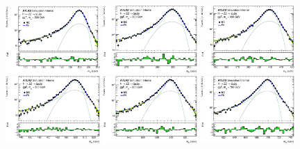 \begin{figure}[htbp]
    \centering
    \includegraphics[width=0.32\textwidth]{figures/HMHZZ/signal/ggf_mass_signal_200_H4l_2mu2e.eps}
    \includegraphics[width=0.32\textwidth]{figures/HMHZZ/signal/ggf_mass_signal_300_H4l_2mu2e.eps}
    \includegraphics[width=0.32\textwidth]{figures/HMHZZ/signal/ggf_mass_signal_400_H4l_2mu2e.eps}\\
    \includegraphics[width=0.32\textwidth]{figures/HMHZZ/signal/ggf_mass_signal_500_H4l_2mu2e.eps}
    \includegraphics[width=0.32\textwidth]{figures/HMHZZ/signal/ggf_mass_signal_600_H4l_2mu2e.eps}
    \includegraphics[width=0.32\textwidth]{figures/HMHZZ/signal/ggf_mass_signal_700_H4l_2mu2e.eps}\\

\end{figure}
